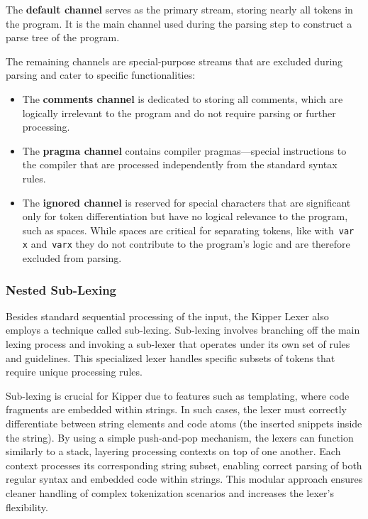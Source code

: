 The \textbf{default channel} serves as the primary stream, storing nearly all tokens in the program. It is the main channel used during the parsing step to construct a parse tree of the program.

The remaining channels are special-purpose streams that are excluded during parsing and cater to specific functionalities:

\begin{itemize}
	\item The \textbf{comments channel} is dedicated to storing all comments, which are logically irrelevant to the program and do not require parsing or further processing.
	\item The \textbf{pragma channel} contains compiler pragmas—special instructions to the compiler that are processed independently from the standard syntax rules.
	\item The \textbf{ignored channel} is reserved for special characters that are significant only for token differentiation but have no logical relevance to the program, such as spaces. While spaces are critical for separating tokens, like with~\lstinline|var x| and~\lstinline|varx| they do not contribute to the program's logic and are therefore excluded from parsing.
\end{itemize}
	
\subsubsection{Nested Sub-Lexing}
\label{sec:nested-sub-lexing}

Besides standard sequential processing of the input, the Kipper Lexer also employs a technique called sub-lexing. Sub-lexing involves branching off the main lexing process and invoking a sub-lexer that operates under its own set of rules and guidelines. This specialized lexer handles specific subsets of tokens that require unique processing rules.

Sub-lexing is crucial for Kipper due to features such as templating, where code fragments are embedded within strings. In such cases, the lexer must correctly differentiate between string elements and code atoms (the inserted snippets inside the string). By using a simple push-and-pop mechanism, the lexers can function similarly to a stack, layering processing contexts on top of one another. Each context processes its corresponding string subset, enabling correct parsing of both regular syntax and embedded code within strings. This modular approach ensures cleaner handling of complex tokenization scenarios and increases the lexer's flexibility.

